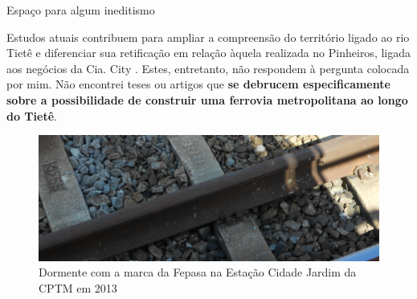 \documentclass[spectratio=43, portuguese]{beamer}
\begin{document}
\begin{frame}{Espaço para algum ineditismo}
	
	Estudos atuais contribuem para ampliar a compreensão do território ligado ao rio Tietê e diferenciar sua retificação em relação àquela realizada no Pinheiros, ligada aos negócios da Cia. City \cite[p. 53]{francca2000a}. Estes, entretanto, não respondem à pergunta colocada por mim. Não encontrei teses ou artigos que \textbf{se debrucem especificamente sobre a possibilidade de construir uma ferrovia metropolitana ao longo do Tietê}.
	
	\begin{figure}
		\centering
		\caption{Dormente com a marca da Fepasa na Estação Cidade Jardim da CPTM em 2013}
		\label{fig:dormente_fepasa}
		\includegraphics[width=0.5\linewidth]{img/DSCN2006}
	\end{figure}
	
\end{frame}

\end{document}
